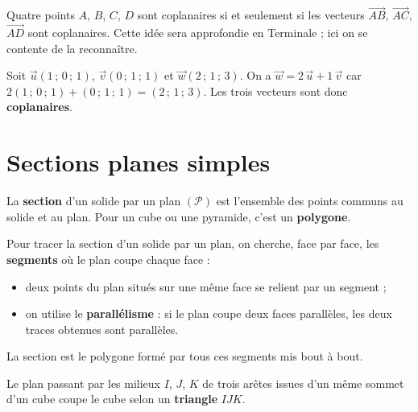 \begin{remarque}
Quatre points $A$, $B$, $C$, $D$ sont coplanaires si et seulement si les vecteurs
$\overrightarrow{AB}$, $\overrightarrow{AC}$, $\overrightarrow{AD}$ sont coplanaires.
Cette idée sera approfondie en Terminale ; ici on se contente de la reconnaître.
\end{remarque}

\begin{exemple}
Soit $\vec{u}(1\,;\,0\,;\,1)$, $\vec{v}(0\,;\,1\,;\,1)$ et $\vec{w}(2\,;\,1\,;\,3)$.
On a $\vec{w}=2\,\vec{u}+1\,\vec{v}$ car $2(1\,;\,0\,;\,1)+(0\,;\,1\,;\,1)=
(2\,;\,1\,;\,3)$. Les trois vecteurs sont donc \textbf{coplanaires}.
\end{exemple}

\section{Sections planes simples}

\begin{definition}
La \textbf{section} d'un solide par un plan $(\mathcal{P})$ est l'ensemble des points
communs au solide et au plan. Pour un cube ou une pyramide, c'est un \textbf{polygone}.
\end{definition}

\begin{aretenir}
Pour tracer la section d'un solide par un plan, on cherche, face par face, les
\textbf{segments} où le plan coupe chaque face :
\begin{itemize}
  \item deux points du plan situés sur une même face se relient par un segment ;
  \item on utilise le \textbf{parallélisme} : si le plan coupe deux faces parallèles,
        les deux traces obtenues sont parallèles.
\end{itemize}
La section est le polygone formé par tous ces segments mis bout à bout.
\end{aretenir}

\begin{exemple}
Le plan passant par les milieux $I$, $J$, $K$ de trois arêtes issues d'un même
sommet d'un cube coupe le cube selon un \textbf{triangle} $IJK$.
\end{exemple}

